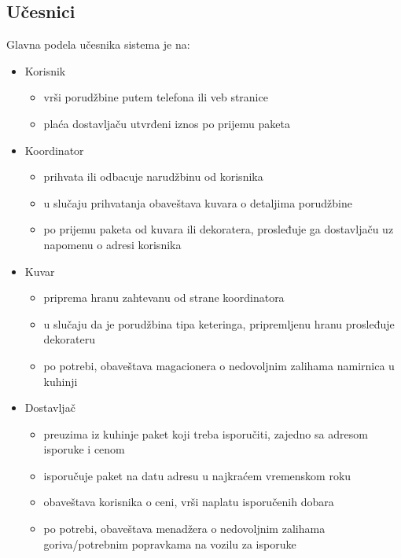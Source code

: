 

\subsection{Učesnici}
Glavna podela učesnika sistema je na:

\begin{itemize}
    \item Korisnik
    \begin{itemize}
        \item vrši porudžbine putem telefona ili veb stranice
        \item plaća dostavljaču utvrđeni iznos po prijemu paketa
    \end{itemize}
    \item Koordinator
    \begin{itemize}
        \item prihvata ili odbacuje narudžbinu od korisnika
        \item u slučaju prihvatanja obaveštava kuvara o detaljima porudžbine
        \item po prijemu paketa od kuvara ili dekoratera, prosleđuje ga dostavljaču uz napomenu o adresi korisnika
    \end{itemize}
    \item Kuvar
    \begin{itemize}
        \item priprema hranu zahtevanu od strane koordinatora
        \item u slučaju da je porudžbina tipa keteringa, pripremljenu hranu prosleđuje dekorateru
        \item po potrebi, obaveštava magacionera o nedovoljnim zalihama namirnica u kuhinji
    \end{itemize}
    \item Dostavljač
    \begin{itemize}
        \item preuzima iz kuhinje paket koji treba isporučiti, zajedno sa adresom isporuke i cenom
        \item isporučuje paket na datu adresu u najkraćem vremenskom roku
        \item obaveštava korisnika o ceni, vrši naplatu isporučenih dobara
        \item po potrebi, obaveštava menadžera o nedovoljnim zalihama goriva/potrebnim popravkama na vozilu za isporuke

\end{itemize}
\end{itemize}
